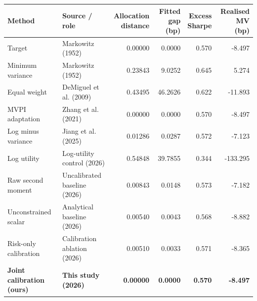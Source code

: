 \begin{tabular}{@{}p{}p{}rrrr@{}}\toprule
Method & Source / role & \shortstack{Allocation\\distance} & \shortstack{Fitted gap\\(bp)} & \shortstack{Excess\\Sharpe} & \shortstack{Realised MV\\(bp)}\\\midrule
Target & Markowitz (1952) & 0.00000 & 0.0000 & 0.570 & -8.497 \\
Minimum variance & Markowitz (1952) & 0.23843 & 9.0252 & 0.645 & 5.274 \\
Equal weight & DeMiguel et al. (2009) & 0.43495 & 46.2626 & 0.622 & -11.893 \\
MVPI adaptation & Zhang et al. (2021) & 0.00000 & 0.0000 & 0.570 & -8.497 \\
Log minus variance & Jiang et al. (2025) & 0.01286 & 0.0287 & 0.572 & -7.123 \\
Log utility & Log-utility control (2026) & 0.54848 & 39.7855 & 0.344 & -133.295 \\
Raw second moment & Uncalibrated baseline (2026) & 0.00843 & 0.0148 & 0.573 & -7.182 \\
Unconstrained scalar & Analytical baseline (2026) & 0.00540 & 0.0043 & 0.568 & -8.882 \\
Risk-only calibration & Calibration ablation (2026) & 0.00510 & 0.0033 & 0.571 & -8.365 \\
\midrule
\textbf{Joint calibration (ours)} & \textbf{This study (2026)} & \textbf{0.00000} & \textbf{0.0000} & \textbf{0.570} & \textbf{-8.497} \\
\bottomrule\end{tabular}
